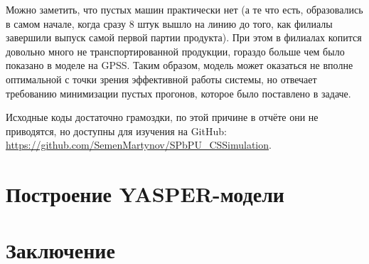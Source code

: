 \documentclass[a4paper, 12pt]{article}        %
\begin{document}
Можно заметить, что пустых машин практически нет (а те что есть, образовались в самом начале, когда сразу 8 штук вышло на линию до того, как филиалы завершили выпуск самой первой партии продукта). При этом в филиалах копится довольно много не транспортированной продукции, гораздо больше чем было показано в моделе на GPSS. Таким образом, модель может оказаться не вполне оптимальной с точки зрения эффективной работы системы, но отвечает требованию минимизации пустых прогонов, которое было поставлено в задаче.

Исходные коды достаточно грамоздки, по этой причине в отчёте они не приводятся, но доступны для изучения на GitHub: \url{https://github.com/SemenMartynov/SPbPU_CSSimulation}.









\newpage
\section{Построение YASPER-модели}

\newpage
\section*{Заключение}

\end{document}
